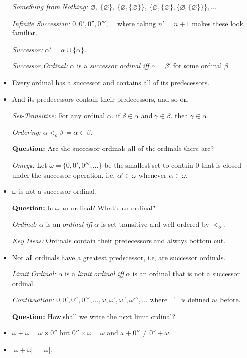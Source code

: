 \documentclass[a4paper, 11pt]{article} %
\newcommand{\set}[1]{\lbrace#1\rbrace} %
\newcommand{\abs}[1]{|#1|} %
\begin{document}
\begin{itemize}
  \item[\it Something from Nothing:] $\varnothing,\ \set{\varnothing},\ \set{\varnothing,\set{\varnothing}},\ \set{\varnothing,\set{\varnothing},\set{\varnothing,\set{\varnothing}}},\ldots$
  \item[\it Infinite Succession:] $0, 0', 0'', 0''',\ldots$ where taking $n' = n + 1$ makes these look familiar.
  \item[\it Successor:] $\alpha' = \alpha \cup \set{\alpha}$.
  \item[\it Successor Ordinal:] $\alpha$ is a \textit{successor ordinal} \textit{iff} $\alpha = \beta'$ for some ordinal $\beta$. 
  \item Every ordinal has a successor and contains all of its predecessors.
  \item And its predecessors contain their predecessors, and so on.
  \item[\it Set-Transitive:] For any ordinal $\alpha$, if $\beta\in\alpha$ and $\gamma\in\beta$, then $\gamma\in\alpha$.
  \item[\it Ordering:] $\alpha <_o \beta \coloneq \alpha \in \beta$.
  \item[\bf Question:] Are the successor ordinals all of the ordinals there are?
  \item[\it Omega:] Let $\omega = \set{0, 0', 0''',\ldots}$ be the smallest set to contain $0$ that is closed under the successor operation, i.e, $\alpha'\in \omega$ whenever $\alpha\in \omega$. 
  \item $\omega$ is not a successor ordinal. 
  \item[\bf Question:] Is $\omega$ an ordinal? What's an ordinal?
  \item[\it Ordinal:] $\alpha$ is an \textit{ordinal iff} $\alpha$ is set-transitive and well-ordered by $<_o$. 
  \item[\it Key Ideas:] Ordinals contain their predecessors and always bottom out.
  \item Not all ordinals have a greatest predecessor, i.e, are successor ordinals.
  \item[\it Limit Ordinal:] $\alpha$ is a \textit{limit ordinal iff} $\alpha$ is an ordinal that is not a successor ordinal. 
  \item[\it Continuation:] $0,0',0'',0''',\ldots,\omega, \omega', \omega'', \omega''',\ldots$ where~ $'$~ is defined as before.
  \item[\bf Question:] How shall we write the next limit ordinal?
  \item $\omega+\omega=\omega\times 0''$ but $0''\times\omega=\omega$ and $\omega + 0''\neq 0'' + \omega$.
  \item $\abs{\omega+\omega} = \abs{\omega}$.
\end{itemize}
\end{document}
